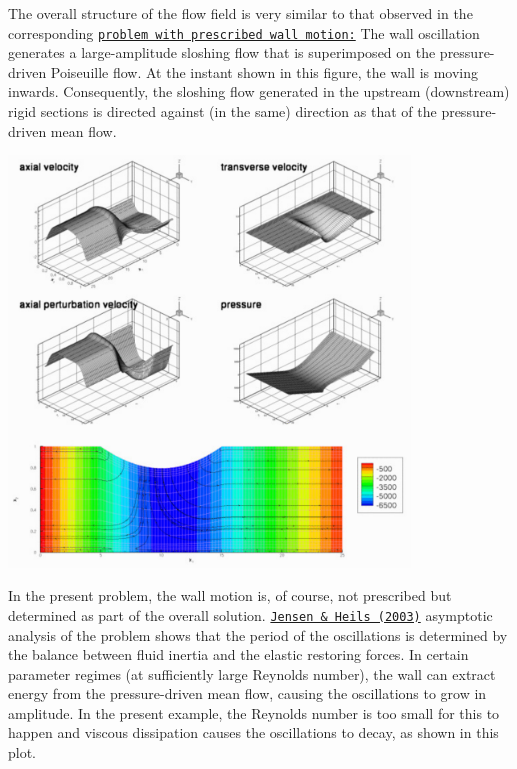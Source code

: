 The overall structure of the flow field is very similar to that observed in the corresponding \href{../../../navier_stokes/collapsible_channel/html/index.html}{\tt problem with prescribed wall motion\+:} The wall oscillation generates a large-\/amplitude sloshing flow that is superimposed on the pressure-\/driven Poiseuille flow. At the instant shown in this figure, the wall is moving inwards. Consequently, the sloshing flow generated in the upstream (downstream) rigid sections is directed against (in the same) direction as that of the pressure-\/driven mean flow.

 
\begin{DoxyImage}
\includegraphics[width=0.8\textwidth]{fsi_taylor_hood_flow}
\end{DoxyImage}


In the present problem, the wall motion is, of course, not prescribed but determined as part of the overall solution. \href{http://www.maths.man.ac.uk/~mheil/MATTHIAS/PDF/JensenHeil2003.pdf}{\tt Jensen \& Heil\textquotesingle{}s (2003)} asymptotic analysis of the problem shows that the period of the oscillations is determined by the balance between fluid inertia and the elastic restoring forces. In certain parameter regimes (at sufficiently large Reynolds number), the wall can extract energy from the pressure-\/driven mean flow, causing the oscillations to grow in amplitude. In the present example, the Reynolds number is too small for this to happen and viscous dissipation causes the oscillations to decay, as shown in this plot.

